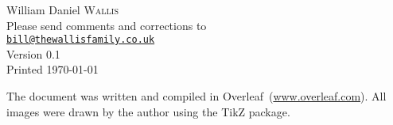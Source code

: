 
{%
\begin{center}%
    William Daniel \textsc{Wallis}\\[10pt]%
    Please send comments and corrections to\\
    \href{mailto:Bill@TheWallisFamily.co.uk}{\texttt{bill@thewallisfamily.co.uk}}\\%

    \vfill%
    Version 0.1\\%
    Printed \today\\%

    \vspace{100pt}

    \vfill%
    The document was written and compiled in Overleaf~(\url{www.overleaf.com}). All images were drawn by the author using the TikZ package.
\end{center}
}

\newpage


\tableofcontents
\newpage
